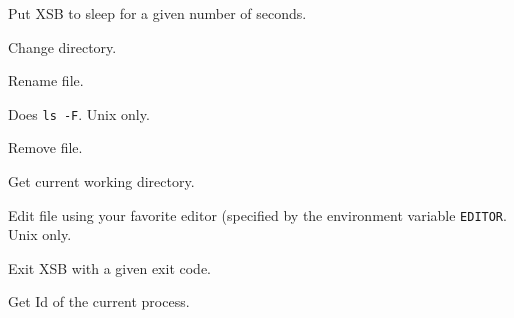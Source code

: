 \begin{description}
Put XSB to sleep for a given number of seconds.

Change directory.

Rename file.

Does {\tt ls -F}. Unix only.

Remove file.

Get current working directory.

Edit file using your favorite editor (specified by the environment variable
{\tt EDITOR}. Unix only.

Exit XSB with a given exit code.

Get Id of the current process.

\end{description}

